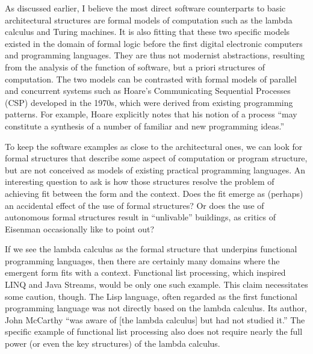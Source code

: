 As discussed earlier, I believe the most direct software counterparts to basic architectural
structures are formal models of computation such as the lambda calculus and Turing machines.
It is also fitting that these two specific models existed in the domain of formal logic before
the first digital electronic computers and programming languages. They are thus not modernist
abstractions, resulting from the analysis of the function of software, but a priori structures
of computation. The two models can be contrasted with formal models of parallel and concurrent
systems such as Hoare's Communicating Sequential Processes (CSP) developed in the
1970s,
which were derived from existing programming patterns. For example, Hoare explicitly notes
that his notion of a process ``may constitute a synthesis of a number of familiar and new
programming ideas.''

To keep the software examples as close to the architectural ones, we can look for formal
structures that describe some aspect of computation or program structure, but are not conceived
as models of existing practical programming languages. An interesting question to ask is how
those structures resolve the problem of achieving fit between the form and the context. Does the
fit emerge as (perhaps) an accidental effect of the use of formal structures? Or does the use
of autonomous formal structures result in ``unlivable'' buildings, as critics of Eisenman
occasionally like to point out?

If we see the lambda calculus as the formal structure that underpins functional programming
languages, then there are certainly many domains where the emergent form fits with a context.
Functional list processing, which inspired LINQ and Java Streams, would be only one such example.
This claim necessitates some caution, though. The Lisp language, often regarded
as the first functional programming language was not directly based on the lambda calculus.
Its author, John McCarthy ``was aware of [the lambda calculus] but had not studied
it.'' The specific
example of functional list processing also does not require nearly the full power (or even the
key structures) of the lambda calculus.


